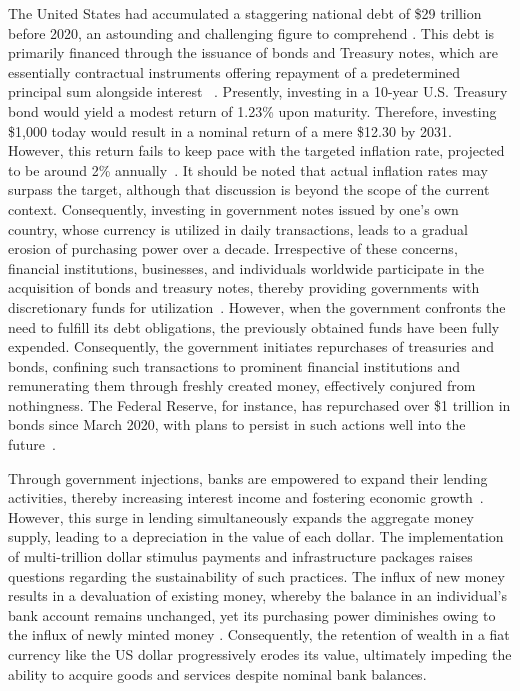 The United States had accumulated a staggering national debt of \$29 trillion before 2020, an astounding and challenging
figure to comprehend \cite{usdebt}. This debt is primarily financed through the issuance of bonds and Treasury notes, which
are essentially contractual instruments offering repayment of a predetermined principal sum alongside interest
~\cite{treasurysecurities}. Presently, investing in a 10-year U.S. Treasury bond would yield a modest return of 1.23\%
upon maturity. Therefore, investing \$1,000 today would result in a nominal return of a mere \$12.30 by 2031. However,
this return fails to keep pace with the targeted inflation rate, projected to be around 2\% annually~\cite{frbinflation}.
It should be noted that actual inflation rates may surpass the target, although that discussion is beyond the scope of the
current context. Consequently, investing in government notes issued by one's own country, whose currency is utilized in
daily transactions, leads to a gradual erosion of purchasing power over a decade. Irrespective of these concerns,
financial institutions, businesses, and individuals worldwide participate in the acquisition of bonds and treasury notes,
thereby providing governments with discretionary funds for utilization~\cite{treasurysecurities}. However, when the government
confronts the need to fulfill its debt obligations, the previously obtained funds have been fully expended. Consequently,
the government initiates repurchases of treasuries and bonds, confining such transactions to prominent financial institutions
and remunerating them through freshly created money, effectively conjured from nothingness. The Federal Reserve, for
instance, has repurchased over \$1 trillion in bonds since March 2020, with plans to persist in such actions well into the
future~\cite{federalreserve}.

Through government injections, banks are empowered to expand their lending activities, thereby increasing interest income
and fostering economic growth~\cite{federalreserve}. However, this surge in lending simultaneously expands the aggregate
money supply, leading to a depreciation in the value of each dollar. The implementation of multi-trillion dollar
stimulus payments and infrastructure packages raises questions regarding the sustainability of such practices. The influx
of new money results in a devaluation of existing money, whereby the balance in an individual's bank account remains unchanged,
yet its purchasing power diminishes owing to the influx of newly minted money \cite{currencydevaluation}. Consequently,
the retention of wealth in a fiat currency like the US dollar progressively erodes its value, ultimately impeding the ability
to acquire goods and services despite nominal bank balances.

